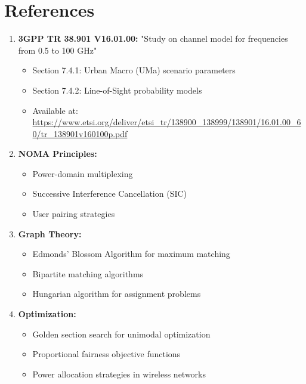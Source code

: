 \documentclass[12pt,a4paper]{article}
\begin{document}
\section{References}

\begin{enumerate}
    \item \textbf{3GPP TR 38.901 V16.01.00:} "Study on channel model for frequencies from 0.5 to 100 GHz"
    \begin{itemize}
        \item Section 7.4.1: Urban Macro (UMa) scenario parameters
        \item Section 7.4.2: Line-of-Sight probability models
        \item Available at: \url{https://www.etsi.org/deliver/etsi_tr/138900_138999/138901/16.01.00_60/tr_138901v160100p.pdf}
    \end{itemize}
    
    \item \textbf{NOMA Principles:}
    \begin{itemize}
        \item Power-domain multiplexing
        \item Successive Interference Cancellation (SIC)
        \item User pairing strategies
    \end{itemize}
    
    \item \textbf{Graph Theory:}
    \begin{itemize}
        \item Edmonds' Blossom Algorithm for maximum matching
        \item Bipartite matching algorithms
        \item Hungarian algorithm for assignment problems
    \end{itemize}
    
    \item \textbf{Optimization:}
    \begin{itemize}
        \item Golden section search for unimodal optimization
        \item Proportional fairness objective functions
        \item Power allocation strategies in wireless networks
    \end{itemize}
\end{enumerate}
\end{document}
